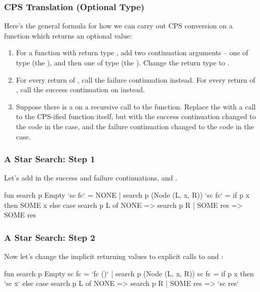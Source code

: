 \documentclass[aspectratio=169]{beamer}
\begin{document}
\begin{frame}[fragile]
  \frametitle{CPS Translation (Optional Type)}

  Here's the general formula for how we can carry out CPS conversion on a function
  which returns an optional value:

  \pause
  \begin{enumerate}
    \item For a function with return type , add two continuation
    arguments -- one of type  (the ),
    and then one of type  (the ).
    Change the return type to . \pause
    \item For every return of , call the failure continuation instead.
    For every return of , call the success continuation on 
    instead. \pause
    \item Suppose there is a  on a recursive call to the function.
    Replace the  with a call to the CPS-ified function itself, but
    with the success continuation changed to the code in the  case,
    and the failure continuation changed to the code in the  case.
  \end{enumerate}
\end{frame}

\begin{frame}[fragile]
  \frametitle{A Star Search: Step 1}

  Let's add in the success and failure continuations,  and .

  \pause
  \vspace{\fill}

  \begin{codeblock}
    fun search p Empty `sc fc` = NONE
      | search p (Node (L, x, R)) `sc fc` =
          if p x then
            SOME x
          else
            case search p L of
              NONE => search p R
            | SOME res => SOME res
  \end{codeblock}
\end{frame}

\begin{frame}[fragile]
  \frametitle{A Star Search: Step 2}

  Now let's change the implicit returning values to explicit calls to
   and :

  \pause
  \vspace{\fill}

  \begin{codeblock}
    fun search p Empty sc fc = `fc ()`
      | search p (Node (L, x, R)) sc fc =
          if p x then
            `sc x`
          else
            case search p L of
              NONE => search p R
            | SOME res => `sc res`
  \end{codeblock}
\end{frame}
\end{document}
